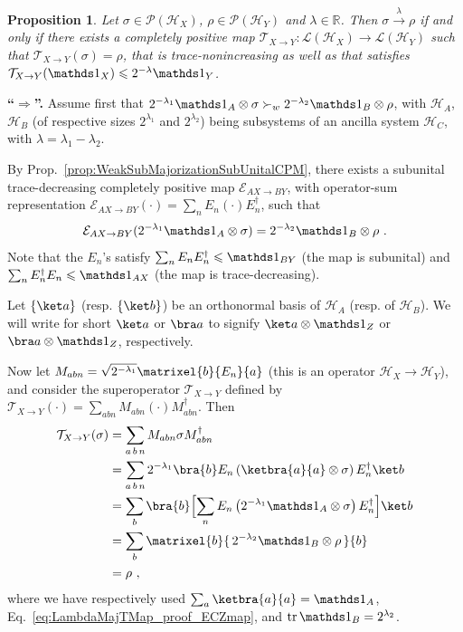 \documentclass[11pt,a4paper]{article}
\theoremstyle{plain}
\newtheorem{prop}[thm]{Proposition}
\def\Hs{\mathscr{H}}%
\newenvironment{myproof}[1][\proofname]{%
  \color{prooftextcolor} \footnotesize \proof[\itshape #1]\hspace*{1.2mm}%
}{\endproof}
\newcommand{\lambdamaj}[1]{\xrightarrow{#1}}
\newcommand{\LOps}{\mathscr{L}}
\newcommand{\POps}{\mathscr{P}}
\begin{document}
\begin{prop}
  \label{prop:LambdaMajorizationTMap}
  Let $\sigma\in\POps(\Hs_X)$, $\rho\in\POps(\Hs_Y)$ and $\lambda\in\mathbb R$. Then $\sigma\lambdamaj\lambda\rho$
  if and only if there exists a completely positive map
  $\mathcal T_{X\rightarrow Y} : \LOps(\Hs_X) \rightarrow \LOps(\Hs_Y)$ such
  that $\mathcal{T}_{X\rightarrow Y}(\sigma) = \rho$, that is trace-nonincreasing as well as that satisfies
  $\mathcal{T}_{X\rightarrow Y}(\Ident_X)\leqslant 2^{-\lambda}\Ident_Y$.
\end{prop}

\begin{myproof}[Proof of Prop.~\ref{prop:LambdaMajorizationTMap}]
  {\bf ``$\boldsymbol\Rightarrow$''.} \hspace*{1.5mm}
  Assume first that $2^{-\lambda_1}\Ident_A\otimes\sigma \succ_w 2^{-\lambda_2}\Ident_B\otimes\rho$, with
  $\Hs_A$, $\Hs_B$ (of respective sizes $2^{\lambda_1}$ and $2^{\lambda_2}$) being subsystems of an ancilla
  system $\Hs_C$, with $\lambda=\lambda_1-\lambda_2$.

  By Prop.~\ref{prop:WeakSubMajorizationSubUnitalCPM}, there exists a subunital trace-decreasing
  completely positive map $\mathcal{E}_{AX\rightarrow BY}$, with operator-sum representation
  $\mathcal{E}_{AX\rightarrow BY}(\cdot) = \sum_n E_n\left(\cdot\right)E_n^\dagger$, such that
  \begin{align}
    \label{eq:LambdaMajTMap_proof_ECZmap}
    \mathcal{E}_{AX\rightarrow BY}(2^{-\lambda_1}\Ident_A\otimes\sigma) = 2^{-\lambda_2}\Ident_B\otimes\rho\ .
  \end{align}
  Note that the $E_n$'s satisfy $\sum_n E_n E_n^\dagger \leqslant \Ident_{BY}$ (the map is subunital) and
  $\sum_n E_n^\dagger E_n \leqslant \Ident_{AX}$ (the map is trace-decreasing).

  Let $\{\ket a\}$ (resp. $\{\ket b\}$) be an orthonormal basis of $\Hs_A$ (resp. of $\Hs_B$). We will write
  for short $\ket a$ or $\bra a$ to signify $\ket a \otimes \Ident_Z$ or $\bra a \otimes \Ident_Z$, respectively.

  Now let $M_{abn} = \sqrt{2^{-\lambda_1}} \matrixel{b}{ E_n }{a}$ (this is an operator $\Hs_X\rightarrow\Hs_Y$),
  and consider the superoperator $\mathcal{T}_{X\rightarrow Y}$ defined by
  $\mathcal{T}_{X\rightarrow Y}(\cdot) = \sum_{abn} M_{abn}\left(\cdot\right)M_{abn}^\dagger$.
  Then
  \begin{align*}
    \mathcal{T}_{X\rightarrow Y}(\sigma) &= \sum_{a\,b\,n} M_{abn}\sigma M_{abn}^\dagger \\
    &= \sum_{a\,b\,n}  2^{-\lambda_1} \bra{b} E_n \left(\ketbra{a}{a}\otimes\sigma\right) E_n^\dagger \ket b \\
    &= \sum_{b}\bra{b} \Bigl[\sum_n E_n \left( 2^{-\lambda_1}\Ident_A\otimes\sigma\right) E_n^\dagger \Bigr] \ket b\\
    &= \sum_{b} \matrixel{b}{ \, 2^{-\lambda_2}\Ident_B\otimes\rho \, }{b} \\
    &= \rho\ ,
  \end{align*}
  where we have respectively used $\sum_a \ketbra{a}{a} = \Ident_A$, Eq.~\eqref{eq:LambdaMajTMap_proof_ECZmap},
  and $\tr \Ident_B = 2^{\lambda_2}$.


\end{myproof}
\end{document}
